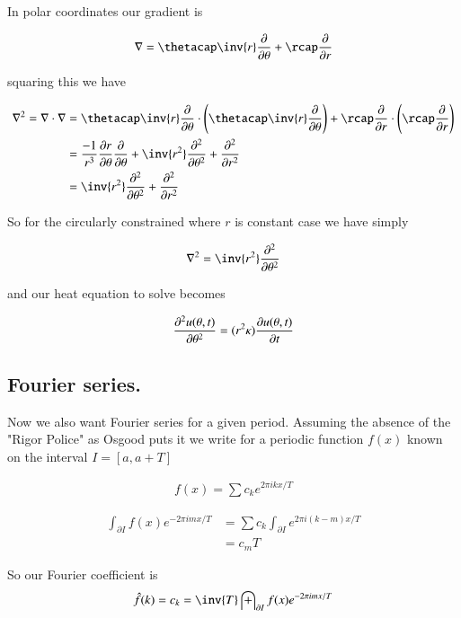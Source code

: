 \documentclass{article}
\newcommand{\PDSq}[2]{\frac{\partial^2 {#2}}{\partial {#1}^2}}
\begin{document}
In polar coordinates our gradient is

\begin{align*}
\grad = \thetacap \inv{r} \PD{\theta}{} +\rcap \PD{r}{} 
\end{align*}

squaring this we have

\begin{align*}
\grad^2 = \grad \cdot \grad
&= 
\thetacap \inv{r} \PD{\theta}{} \cdot \left(\thetacap \inv{r} \PD{\theta}{}\right)
 +
\rcap \PD{r}{} \cdot \left(\rcap \PD{r}{} \right) \\
&= 
\frac{-1}{r^3} \PD{\theta}{r} \PD{\theta}{}
+\inv{r^2} \PDSq{\theta}{}
+ \PDSq{r}{}
\\
&= \inv{r^2} \PDSq{\theta}{} + \PDSq{r}{} \\
\end{align*}

So for the circularly constrained where $r$ is constant case we have simply

\begin{align}
\grad^2 = \inv{r^2} \PDSq{\theta}{}
\end{align}

and our heat equation to solve becomes

\begin{align}
\PDSq{\theta}{u(\theta, t)} = (r^2 \kappa) \PD{t}{u(\theta, t)}
\end{align}

\subsection{ Fourier series. }

Now we also want Fourier series for a given period.  Assuming the absence of the "Rigor Police" as Osgood puts it
we write for a periodic function $f(x)$ known on the interval $I = [a, a+T]$

\begin{align*}
f(x) = \sum c_k e^{2\pi i k x/T}
\end{align*}

\begin{align*}
\int_{\partial I} f(x) e^{- 2 \pi i m x /T} 
&= \sum c_k \int_{\partial I} e^{2\pi i (k -m) x/T} \\
&= c_m T
\end{align*}

So our Fourier coefficient is
\begin{align*}
\hat{f}(k) = c_k = \inv{T} \int_{\partial I} f(x) e^{- 2 \pi i m x /T} 
\end{align*}
\end{document}
